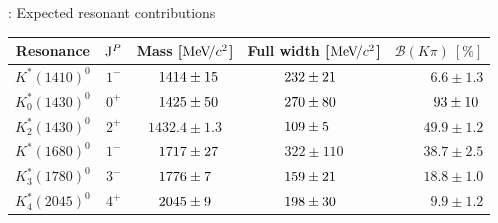 \documentclass[aspectratio=1610]{beamer}
\begin{document}

\begin{frame}{\BdToKpimm: Expected resonant contributions}

\begin{center}
\begin{tabular}{c|c|c|c|r}
Resonance & ${\rm J}^{P}$ & Mass [$\mathrm{Me\kern -0.1em V\!/}c^2$] & Full width [$\mathrm{Me\kern -0.1em V\!/}c^2$]  & $\mathcal{B}(K\pi)~[\%]$ \\
\hline
$K^\ast(1410)^0$ & $1^{-}$& $\hphantom{0.}1414 \pm 15\hphantom{.}$& $232 \pm 21\hphantom{0}$  & $6.6 \pm 1.3$ \\
$K^\ast_0(1430)^0$ & $0^{+}$ & $\hphantom{0.}1425 \pm 50\hphantom{.}$ & $270 \pm 80\hphantom{0}$ & $\hphantom{.}93 \pm 10\hphantom{.}$ \\
$K^\ast_2(1430)^0$ & $2^{+}$ & $1432.4\pm 1.3$ & $109 \pm 5\hphantom{00}$ & $49.9 \pm 1.2$ \\
$K^\ast(1680)^0$ & $1^{-}$ & $\hphantom{0.}1717 \pm 27\hphantom{.}$ & $322 \pm 110$ & $38.7 \pm 2.5$ \\
$K^\ast_3(1780)^0$ & $3^{-}$ & $\hphantom{0.}1776 \pm 7\hphantom{0.}$ & $159 \pm 21\hphantom{0}$ & $18.8 \pm 1.0$ \\
$K^\ast_4(2045)^0$ & $4^{+}$ & $\hphantom{0.}2045 \pm 9\hphantom{0.}$ & $198 \pm 30\hphantom{0}$ & $9.9 \pm 1.2$ \\
\end{tabular}
\end{center}

\end{frame}
\end{document}
